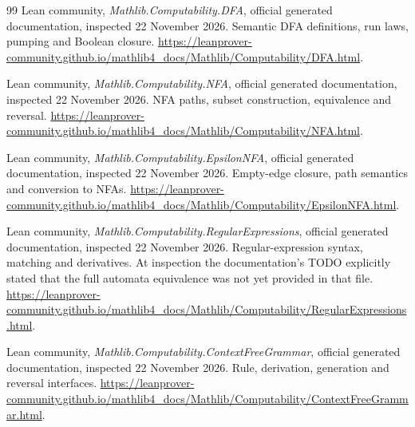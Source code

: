 \begin{thebibliography}{99}
Lean community, \emph{Mathlib.Computability.DFA}, official generated
documentation, inspected 22 November 2026. Semantic DFA definitions,
run laws, pumping and Boolean closure.
\url{https://leanprover-community.github.io/mathlib4_docs/Mathlib/Computability/DFA.html}.

Lean community, \emph{Mathlib.Computability.NFA}, official generated
documentation, inspected 22 November 2026. NFA paths, subset construction,
equivalence and reversal.
\url{https://leanprover-community.github.io/mathlib4_docs/Mathlib/Computability/NFA.html}.

Lean community, \emph{Mathlib.Computability.EpsilonNFA}, official generated
documentation, inspected 22 November 2026. Empty-edge closure,
path semantics and conversion to NFAs.
\url{https://leanprover-community.github.io/mathlib4_docs/Mathlib/Computability/EpsilonNFA.html}.

Lean community, \emph{Mathlib.Computability.RegularExpressions}, official
generated documentation, inspected 22 November 2026. Regular-expression
syntax, matching and derivatives. At inspection the documentation's
TODO explicitly stated that the full automata equivalence was not yet
provided in that file.
\url{https://leanprover-community.github.io/mathlib4_docs/Mathlib/Computability/RegularExpressions.html}.

Lean community, \emph{Mathlib.Computability.ContextFreeGrammar}, official
generated documentation, inspected 22 November 2026. Rule, derivation,
generation and reversal interfaces.
\url{https://leanprover-community.github.io/mathlib4_docs/Mathlib/Computability/ContextFreeGrammar.html}.

\end{thebibliography}
